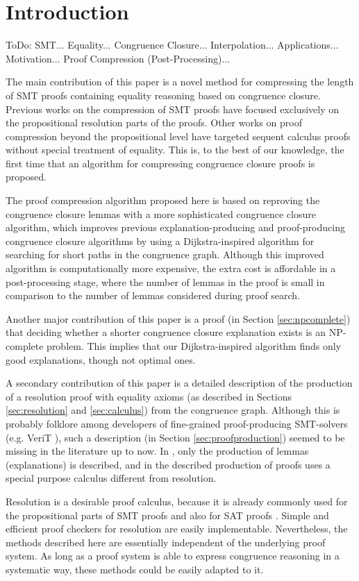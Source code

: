 \section{Introduction}

ToDo:
SMT... Equality... Congruence Closure... Interpolation... Applications... Motivation... Proof Compression (Post-Processing)...


The main contribution of this paper is a novel method for compressing the length of SMT proofs containing equality reasoning based on congruence closure. Previous works \cite{ToDo: all Skeptik publications and others} on the compression of SMT proofs have focused exclusively on the propositional resolution parts of the proofs. Other works \cite{ToDo: Cut-introduction works} on proof compression beyond the propositional level have targeted sequent calculus proofs without special treatment of equality. This is, to the best of our knowledge, the first time that an algorithm for compressing congruence closure proofs is proposed.

The proof compression algorithm proposed here is based on reproving the congruence closure lemmas with a more sophisticated congruence closure algorithm, which improves previous explanation-producing \cite{Nieuwenhuis2005,Nieuwenhuis2007} and proof-producing \cite{Fontaine2004} congruence closure algorithms by using a Dijkstra-inspired algorithm for searching for short paths in the congruence graph. Although this improved algorithm is computationally more expensive, the extra cost is affordable in a post-processing stage, where the number of lemmas in the proof is small in comparison to the number of lemmas considered during proof search.

Another major contribution of this paper is a proof (in Section \ref{sec:npcomplete}) that deciding whether a shorter congruence closure explanation exists is an NP-complete problem. This implies that our Dijkstra-inspired algorithm finds only good explanations, though not optimal ones.

A secondary contribution of this paper is a detailed description of the production of a resolution proof with equality axioms (as described in Sections \ref{sec:resolution} and \ref{sec:calculus}) from the congruence graph. Although this is probably folklore among developers of fine-grained proof-producing SMT-solvers (e.g. VeriT \cite{ToDo}), such a description (in Section \ref{sec:proofproduction}) seemed to be missing in the literature up to now. In \cite{Nieuwenhuis2005,Nieuwenhuis2007}, only the production of lemmas (explanations) is described, and in \cite{Fontaine2004} the described production of proofs uses a special purpose calculus different from resolution. 

Resolution is a desirable proof calculus, because it is already commonly used for the propositional parts of SMT proofs and also for SAT proofs \cite{ToDo:TraceCheckFormatArminBiere}. Simple and efficient proof checkers for resolution are easily implementable. Nevertheless, the methods described here are essentially independent of the underlying proof system. As long as a proof system is able to express congruence reasoning in a systematic way, these methods could be easily adapted to it.


